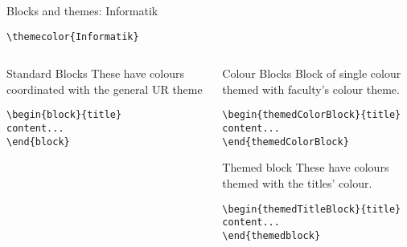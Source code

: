 \begingroup
{}
\begin{frame}[fragile]{Blocks and themes: Informatik}
    \begin{center}\verb|\themecolor{Informatik}|\end{center}
\begin{columns} %
\begin{column}{0.3\textwidth}
\begin{block}{Standard Blocks}
These have colours coordinated with the general UR theme
\begin{verbatim}
\begin{block}{title}
content...
\end{block}
\end{verbatim}
\end{block}
\end{column}
\begin{column}{0.7\textwidth}
\begin{themedColorBlock}{Colour Blocks}
Block of single colour themed with faculty's colour theme.
\small
\begin{verbatim}
\begin{themedColorBlock}{title}
content...
\end{themedColorBlock}
\end{verbatim}
\end{themedColorBlock}
\begin{themedTitleBlock} {Themed block}
These have colours themed with the titles' colour.
\small
\begin{verbatim}
\begin{themedTitleBlock}{title}
content...
\end{themedblock}
\end{verbatim}
\end{themedTitleBlock}
\end{column}
\end{columns}
\end{frame}
\endgroup


